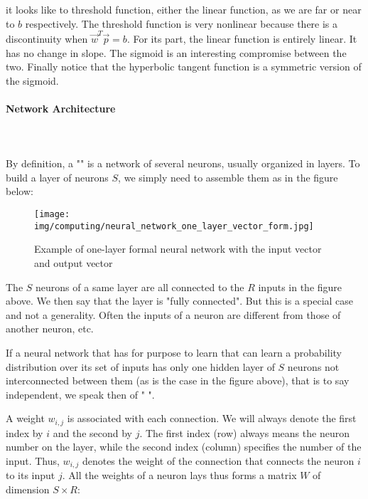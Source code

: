 	it looks like to threshold function, either the linear function, as we are far or near to $b$ respectively. The threshold function is very nonlinear because there is a discontinuity when $\vec{w}^T\vec{p}=b$. For its part, the linear function is entirely linear. It has no change in slope. The sigmoid is an interesting compromise between the two. Finally notice that the hyperbolic tangent function is a symmetric version of the sigmoid.
	
	
	\paragraph{Network Architecture}\mbox{}\\\\
	By definition, a "" is a network of several neurons, usually organized in layers. To build a layer of neurons $S$, we simply need to assemble them as in the figure below:
	\begin{figure}[H]
		\centering
		\texttt{[image: img/computing/neural\_network\_one\_layer\_vector\_form.jpg]}
		\caption{Example of one-layer formal neural network with the input vector and output vector}
	\end{figure}
	The $S$ neurons of a same layer are all connected to the $R$ inputs in the figure above. We then say that the layer is "fully connected". But this is a special case and not a generality. Often the inputs of a neuron are different from those of another neuron, etc.
	
	\begin{tcolorbox}[title=Remark,colframe=black,arc=10pt]
	If a neural network that has for purpose to learn that can learn a probability distribution over its set of inputs has only one hidden layer of $S$ neurons not interconnected between them (as is the case in the figure above), that is to say independent, we speak then of " ".
	\end{tcolorbox}
	
	A weight $w_{i,j}$ is associated with each connection. We will always denote the first index by $i$ and the second by $j$. The first index (row) always means the neuron number on the layer, while the second index (column) specifies the number of the input. Thus, $w_{i,j}$ denotes the weight of the connection that connects the neuron $i$ to its input $j$. All the weights of a neuron lays thus forms a matrix $W$ of dimension $S\times R$:
	
